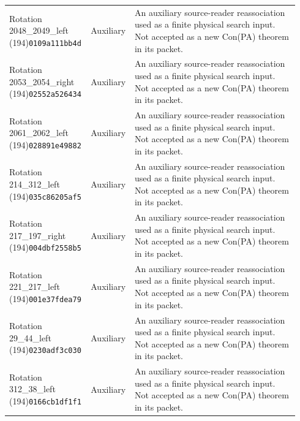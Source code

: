 \begin{longtable}{@{}p{0.24\linewidth}p{0.14\linewidth}p{0.56\linewidth}@{}}
Rotation 2048\_2049\_left (194)\newline\texttt{0109a111bb4d} & Auxiliary & An auxiliary source-reader reassociation used as a finite physical search input. Not accepted as a new Con(PA) theorem in its packet.\\[4pt]
Rotation 2053\_2054\_right (194)\newline\texttt{02552a526434} & Auxiliary & An auxiliary source-reader reassociation used as a finite physical search input. Not accepted as a new Con(PA) theorem in its packet.\\[4pt]
Rotation 2061\_2062\_left (194)\newline\texttt{028891e49882} & Auxiliary & An auxiliary source-reader reassociation used as a finite physical search input. Not accepted as a new Con(PA) theorem in its packet.\\[4pt]
Rotation 214\_312\_left (194)\newline\texttt{035c86205af5} & Auxiliary & An auxiliary source-reader reassociation used as a finite physical search input. Not accepted as a new Con(PA) theorem in its packet.\\[4pt]
Rotation 217\_197\_right (194)\newline\texttt{004dbf2558b5} & Auxiliary & An auxiliary source-reader reassociation used as a finite physical search input. Not accepted as a new Con(PA) theorem in its packet.\\[4pt]
Rotation 221\_217\_left (194)\newline\texttt{001e37fdea79} & Auxiliary & An auxiliary source-reader reassociation used as a finite physical search input. Not accepted as a new Con(PA) theorem in its packet.\\[4pt]
Rotation 29\_44\_left (194)\newline\texttt{0230adf3c030} & Auxiliary & An auxiliary source-reader reassociation used as a finite physical search input. Not accepted as a new Con(PA) theorem in its packet.\\[4pt]
Rotation 312\_38\_left (194)\newline\texttt{0166cb1df1f1} & Auxiliary & An auxiliary source-reader reassociation used as a finite physical search input. Not accepted as a new Con(PA) theorem in its packet.\\[4pt]
\bottomrule\end{longtable}
